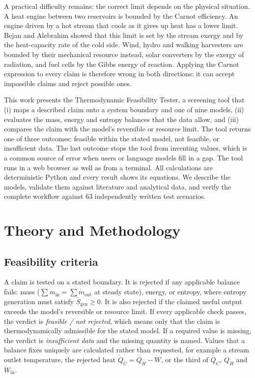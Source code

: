 \documentclass[journal=iecred,manuscript=article,layout=twocolumn,email=false]{achemso}
\begin{document}
A practical difficulty remains: the correct limit depends on the physical situation. A heat engine between two
reservoirs is bounded by the Carnot efficiency. An engine driven by a hot stream that cools as it gives up heat has a
lower limit. Bejan and Alebrahim showed that this limit is set by the stream exergy and by the heat-capacity rate of
the cold side.\cite{Bejan2001} Wind, hydro and walking harvesters are bounded by their mechanical resource
instead,\cite{Betz1920,Li2009} solar converters by the exergy of radiation,\cite{Petela2003} and fuel cells by the
Gibbs energy of reaction.\cite{NETL2004} Applying the Carnot expression to every claim is therefore wrong in both
directions: it can accept impossible claims and reject possible ones.

This work presents the Thermodynamic Feasibility Tester, a screening tool that (i) maps a described claim onto a
system boundary and one of nine models, (ii) evaluates the mass, energy and entropy balances that the data allow, and
(iii) compares the claim with the model's reversible or resource limit. The tool returns one of three outcomes:
feasible within the stated model, not feasible, or insufficient data. The last outcome stops the tool from inventing
values, which is a common source of error when users or language models fill in a gap. The tool runs in a web browser
as well as from a terminal. All calculations are deterministic Python and every result shows its equations. We
describe the models, validate them against literature and analytical data, and verify the complete workflow against
63 independently written test scenarios.

\section{Theory and Methodology}
\subsection{Feasibility criteria}
A claim is tested on a stated boundary. It is rejected if any applicable balance fails: mass ($\sum\dot m_\mathrm{in}
=\sum\dot m_\mathrm{out}$ at steady state), energy, or entropy, where entropy generation must satisfy
$\dot S_\mathrm{gen}\ge0$.\cite{Wang2017,Xue2019} It is also rejected if the claimed useful output exceeds the model's
reversible or resource limit. If every applicable check passes, the verdict is \emph{feasible / not rejected}, which
means only that the claim is thermodynamically admissible for the stated model. If a required value is missing, the
verdict is \emph{insufficient data} and the missing quantity is named. Values that a balance fixes uniquely are
calculated rather than requested, for example a stream outlet temperature, the rejected heat $\dot Q_C=\dot Q_H-\dot W$,
or the third of $\dot Q_C$, $\dot Q_H$ and $\dot W_\mathrm{in}$.
\end{document}
